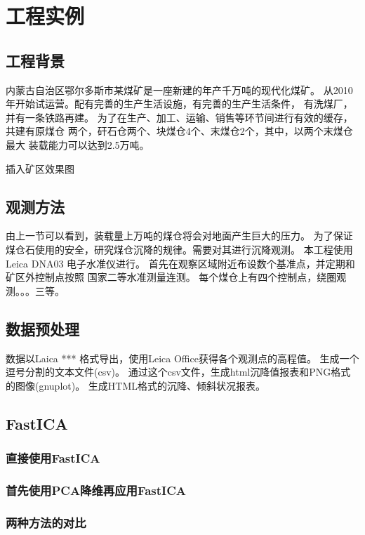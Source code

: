 ﻿%

\chapter{工程实例}

\label{chap04}

\section{工程背景} 
内蒙古自治区鄂尔多斯市某煤矿是一座新建的年产千万吨的现代化煤矿。
从2010年开始试运营。配有完善的生产生活设施，有完善的生产生活条件，
有洗煤厂，并有一条铁路再建。
为了在生产、加工、运输、销售等环节间进行有效的缓存，共建有原煤仓
两个，矸石仓两个、块煤仓4个、末煤仓2个，其中，以两个末煤仓最大
装载能力可以达到2.5万吨。
               
                  插入矿区效果图


\section{观测方法}
由上一节可以看到，装载量上万吨的煤仓将会对地面产生巨大的压力。
为了保证煤仓石使用的安全，研究煤仓沉降的规律。需要对其进行沉降观测。
本工程使用Leica DNA03 电子水准仪进行。
首先在观察区域附近布设数个基准点，并定期和矿区外控制点按照
国家二等水准测量连测。
每个煤仓上有四个控制点，绕圈观测。。。三等。

\section{数据预处理}
数据以Laica *** 格式导出，使用Leica Office获得各个观测点的高程值。
生成一个逗号分割的文本文件(csv)。
通过这个csv文件，生成html沉降值报表和PNG格式的图像(gnuplot)。
生成HTML格式的沉降、倾斜状况报表。


\section{FastICA}
\subsection{直接使用FastICA}
\subsection{首先使用PCA降维再应用FastICA}
\subsection{两种方法的对比}
